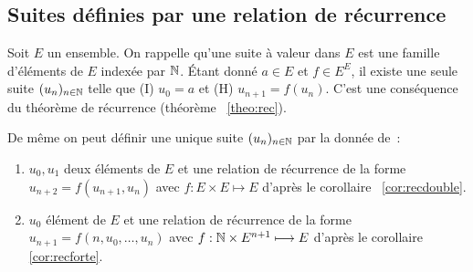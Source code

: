 \subsection{Suites définies par une relation de récurrence}

Soit \(E\) un ensemble. On rappelle qu'une suite à valeur dans \(E\) est une famille d'éléments de \(E\) indexée par \(\mathbb{N}\). Étant donné \(a\in E\) et \(f\in E^E\), il existe une seule suite \((u_n)_{n\in\mathbb{N}}\) telle que (I) \(u_0=a\) et (H) \(u_{n+1}=f(u_n)\). C'est une conséquence du théorème de récurrence (théorème~
\ref{theo:rec}).

De même on peut définir une unique suite \((u_n)_{n\in\mathbb{N}}\) par la donnée de~:
\begin{enumerate}
\item \(u_0, u_1\) deux éléments de \(E\) et une relation de récurrence de la forme \(u_{n+2}=f(u_{n+1},u_{n})\) avec \(f:E\times E\longmapsto E\) d'après le corollaire~
\ref{cor:recdouble}.
\item \(u_0\) élément de \(E\) et une relation de récurrence de la forme \(u_{n+1}=f(n,u_{0},\ldots,u_{n})\) avec \(f:\mathbb{N}\times E^{n+1}\longmapsto E\) d'après le corollaire~
\ref{cor:recforte}.
\end{enumerate}

